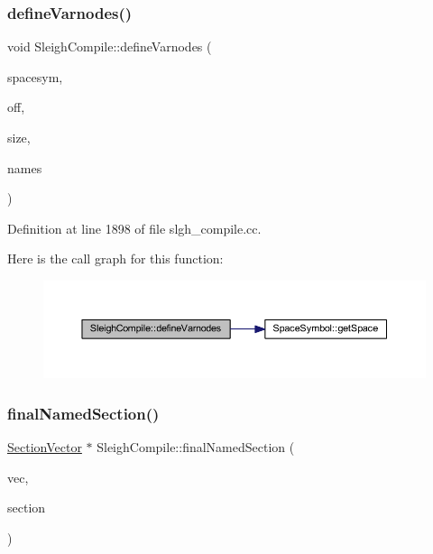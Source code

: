 \subsubsection{\texorpdfstring{defineVarnodes()}{defineVarnodes()}}
{\footnotesize\ttfamily void Sleigh\+Compile\+::define\+Varnodes (\begin{DoxyParamCaption}\item[{\mbox{\hyperlink{class_space_symbol}{Space\+Symbol}} $\ast$}]{spacesym,  }\item[{\mbox{\hyperlink{types_8h_a2db313c5d32a12b01d26ac9b3bca178f}{uintb}} $\ast$}]{off,  }\item[{\mbox{\hyperlink{types_8h_a2db313c5d32a12b01d26ac9b3bca178f}{uintb}} $\ast$}]{size,  }\item[{vector$<$ string $>$ $\ast$}]{names }\end{DoxyParamCaption})}



Definition at line 1898 of file slgh\+\_\+compile.\+cc.

Here is the call graph for this function\+:
\nopagebreak
\begin{figure}[H]
\begin{center}
\leavevmode
\includegraphics[width=350pt]{class_sleigh_compile_a97fb4d4cb94d8de8eaba37c0aac16bce_cgraph}
\end{center}
\end{figure}
\mbox{\label{class_sleigh_compile_a95a09437387d25e9c256633a487bd6cd}} 
\subsubsection{\texorpdfstring{finalNamedSection()}{finalNamedSection()}}
{\footnotesize\ttfamily \mbox{\hyperlink{class_section_vector}{Section\+Vector}} $\ast$ Sleigh\+Compile\+::final\+Named\+Section (\begin{DoxyParamCaption}\item[{\mbox{\hyperlink{class_section_vector}{Section\+Vector}} $\ast$}]{vec,  }\item[{\mbox{\hyperlink{class_construct_tpl}{Construct\+Tpl}} $\ast$}]{section }\end{DoxyParamCaption})}




